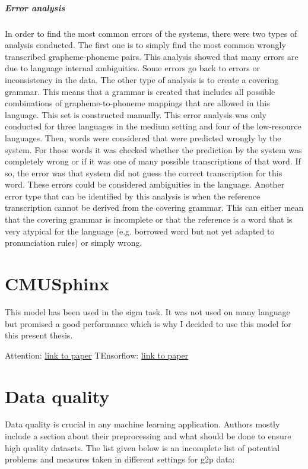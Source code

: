   
\subparagraph{Error analysis}
In order to find the most common errors of the systems, there were two types of analysis conducted. The first one is to simply find the most common wrongly transcribed grapheme-phoneme pairs. This analysis showed that many errors are due to language internal ambiguities. Some errors go back to errors or inconsistency in the data. 
The other type of analysis is to create a covering grammar. This means that a grammar is created that includes all possible combinations of grapheme-to-phoneme mappings that are allowed in this language. This set is constructed manually. This error analysis was only conducted for three languages in the medium setting and four of the low-resource languages. Then, words were considered that were predicted wrongly by the system. For those words it was checked whether the prediction by the system was completely wrong or if it was one of many possible transcriptions of that word. If so, the error was that system did not guess the correct transcription for this word. These errors could be considered ambiguities in the language. Another error type that can be identified by this analysis is when the reference transcription cannot be derived from the covering grammar. This can either mean that the covering grammar is incomplete or that the reference is a word that is very atypical for the language (e.g. borrowed word but not yet adapted to pronunciation rules) or simply wrong. 

\section{CMUSphinx}
\label{sec:cmu}
This model has been used in the \ac{sigm} task. It was not used on many language but promised a good performance which is why I decided to use this model for this present thesis. 

Attention: \href{https://papers.nips.cc/paper/2017/hash/3f5ee243547dee91fbd053c1c4a845aa-Abstract.html}{link to paper}
TEnsorflow: \href{https://arxiv.org/abs/1603.04467}{link to paper}

\section{Data quality}
\label{data_qual}
Data quality is crucial in any machine learning application. Authors mostly include a section about their preprocessing and what should be done to ensure high quality datasets. The list given below is an incomplete list of potential problems and measures taken in different settings for \ac{g2p} data:

